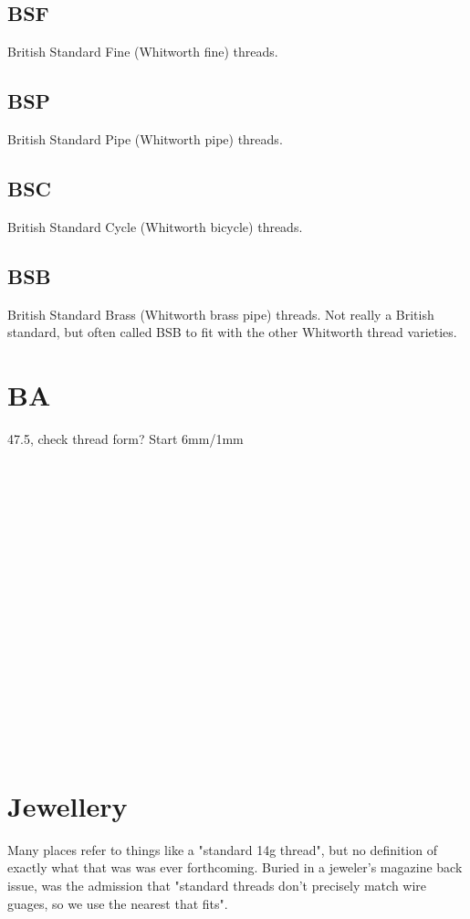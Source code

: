 \subsection{BSF}
British Standard Fine (Whitworth fine) threads.
\clearpage

\subsection{BSP}
British Standard Pipe (Whitworth pipe) threads.
\clearpage

\subsection{BSC}
British Standard Cycle (Whitworth bicycle) threads.
\clearpage

\subsection{BSB}
British Standard Brass (Whitworth brass pipe) threads.  Not really a British standard, but often called BSB to fit with the other Whitworth thread varieties.
\clearpage

\clearpage
\section{BA}
47.5\degree, check thread form?
Start 
6mm/1mm
\\ \\ \\ \\ \\ \\ \\ \\ \\ \\ \\ \\ \\ \\ \\ \\ \\ \\               



\clearpage
\section{Jewellery}
Many places refer to things like a "standard 14g thread", but no definition of exactly what that was was ever forthcoming.  Buried in a jeweler's magazine back issue, was the admission that "standard threads don't precisely match wire guages, so we use the nearest that fits".  

